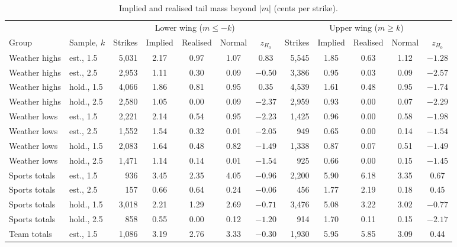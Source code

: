 \begin{table}[ht]
\centering\scriptsize
\setlength{\tabcolsep}{3pt}
\begin{threeparttable}
\caption{Implied and realised tail mass beyond $|m|$ (cents per strike).}\label{tab:lad-tails}
\begin{tabular}{@{}llrccccrcccc@{}}
\toprule
 & & \multicolumn{5}{c}{Lower wing ($m\le-k$)} & \multicolumn{5}{c}{Upper wing ($m\ge k$)} \\
\cmidrule(lr){3-7}\cmidrule(lr){8-12}
Group & Sample, $k$ & Strikes & Implied & Realised & Normal & $z_{H_0}$ & Strikes & Implied & Realised & Normal & $z_{H_0}$ \\
\midrule
Weather highs & est., 1.5 & 5,031 & 2.17 & 0.97 & 1.07 & 0.83 & 5,545 & 1.85 & 0.63 & 1.12 & $-1.28$ \\
Weather highs & est., 2.5 & 2,953 & 1.11 & 0.30 & 0.09 & $-0.50$ & 3,386 & 0.95 & 0.03 & 0.09 & $-2.57$ \\
Weather highs & hold., 1.5 & 4,066 & 1.86 & 0.81 & 0.95 & 0.35 & 4,539 & 1.61 & 0.48 & 0.95 & $-1.74$ \\
Weather highs & hold., 2.5 & 2,580 & 1.05 & 0.00 & 0.09 & $-2.37$ & 2,959 & 0.93 & 0.00 & 0.07 & $-2.29$ \\
Weather lows & est., 1.5 & 2,221 & 2.14 & 0.54 & 0.95 & $-2.23$ & 1,425 & 0.96 & 0.00 & 0.58 & $-1.98$ \\
Weather lows & est., 2.5 & 1,552 & 1.54 & 0.32 & 0.01 & $-2.05$ & 949 & 0.65 & 0.00 & 0.14 & $-1.54$ \\
Weather lows & hold., 1.5 & 2,083 & 1.64 & 0.48 & 0.82 & $-1.49$ & 1,338 & 0.87 & 0.07 & 0.51 & $-1.49$ \\
Weather lows & hold., 2.5 & 1,471 & 1.14 & 0.14 & 0.01 & $-1.54$ & 925 & 0.66 & 0.00 & 0.15 & $-1.45$ \\
Sports totals & est., 1.5 & 936 & 3.45 & 2.35 & 4.05 & $-0.96$ & 2,200 & 5.90 & 6.18 & 3.35 & 0.67 \\
Sports totals & est., 2.5 & 157 & 0.66 & 0.64 & 0.24 & $-0.06$ & 456 & 1.77 & 2.19 & 0.18 & 0.45 \\
Sports totals & hold., 1.5 & 3,018 & 2.21 & 1.29 & 2.69 & $-0.71$ & 3,476 & 5.08 & 3.22 & 3.02 & $-0.77$ \\
Sports totals & hold., 2.5 & 858 & 0.55 & 0.00 & 0.12 & $-1.20$ & 914 & 1.70 & 0.11 & 0.15 & $-2.17$ \\
Team totals & est., 1.5 & 1,086 & 3.19 & 2.76 & 3.33 & $-0.30$ & 1,930 & 5.95 & 5.85 & 3.09 & 0.44 \\

\end{tabular}
\end{threeparttable}
\end{table}
